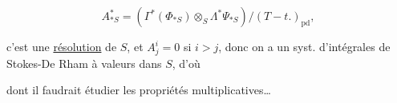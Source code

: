 \[
A^*_{*S}=(\Gamma^*(\Phi_{*S})\otimes_S\Lambda^*\Psi_{*S})/(T-t.)_{\mathrm{pd}},
\]

c'est une \uline{résolution} de $S$, et $A_j^i=0$ si $i>j$, donc on a un syst. d'intégrales de Stokes-De Rham à valeurs dans $S$, d'où


dont il faudrait étudier les propriétés multiplicatives\ldots

